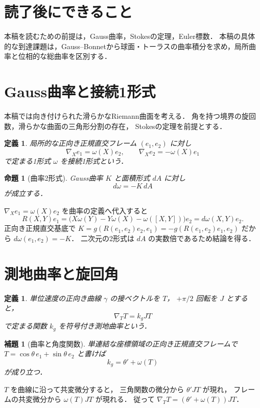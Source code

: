 \documentclass[a5paper,10pt,onecolumn]{jsarticle}
\makeatletter
\theoremstyle{mathnotetheorem}
\newtheorem{definition}[theorem]{定義}
\newtheorem{lemma}[theorem]{補題}
\newtheorem{proposition}[theorem]{命題}
\renewcommand{\proofname}{証明}
\renewenvironment{proof}[1][\proofname]{%
  \par\pushQED{\qed}\normalfont\topsep4\p@\@plus2\p@\relax
  \trivlist\item[\hskip\labelsep\bfseries #1]\ignorespaces
}{\popQED\endtrivlist\@endpefalse}
\makeatother
\begin{document}
\section*{読了後にできること}
本稿を読むための前提は，Gauss曲率，Stokesの定理，Euler標数．
本稿の具体的な到達課題は，Gauss--Bonnetから球面・トーラスの曲率積分を求め，局所曲率と位相的な総曲率を区別する．


\section{Gauss曲率と接続1形式}
本稿では向き付けられた滑らかなRiemann曲面を考える．
角を持つ境界の旋回数，滑らかな曲面の三角形分割の存在，
Stokesの定理を前提とする．
\begin{definition}
局所的な正向き正規直交フレーム $(e_1,e_2)$ に対し
\[
 \nabla_Xe_1=\omega(X)e_2,\qquad
 \nabla_Xe_2=-\omega(X)e_1
\]
で定まる1形式 $\omega$ を接続1形式という．
\end{definition}
\begin{proposition}[曲率2形式]\label{prop:curvform}
Gauss曲率 $K$ と面積形式 $dA$ に対し
\[
 d\omega=-K\,dA
\]
が成立する．
\end{proposition}
\begin{proof}
$\nabla_Xe_1=\omega(X)e_2$ を曲率の定義へ代入すると
\[
 R(X,Y)e_1=
 \bigl(X\omega(Y)-Y\omega(X)-\omega([X,Y])\bigr)e_2
 =d\omega(X,Y)e_2.
\]
正向き正規直交基底で
$K=g(R(e_1,e_2)e_2,e_1)
=-g(R(e_1,e_2)e_1,e_2)$ だから
$d\omega(e_1,e_2)=-K$．
二次元の2形式は $dA$ の実数倍であるため結論を得る．
\end{proof}
\section{測地曲率と旋回角}
\begin{definition}
単位速度の正向き曲線 $\gamma$ の接ベクトルを $T$，
$+\pi/2$ 回転を $J$ とすると，
\[
 \nabla_TT=k_gJT
\]
で定まる関数 $k_g$ を符号付き測地曲率という．
\end{definition}
\begin{lemma}[曲率と角度関数]\label{lem:turn}
単連結な座標領域の正向き正規直交フレームで
$T=\cos\theta\,e_1+\sin\theta\,e_2$ と書けば
\[
 k_g=\theta'+\omega(T)
\]
が成り立つ．
\end{lemma}
\begin{proof}
$T$ を曲線に沿って共変微分すると，
三角関数の微分から $\theta'JT$ が現れ，
フレームの共変微分から $\omega(T)JT$ が現れる．
従って $\nabla_TT=(\theta'+\omega(T))JT$．
\end{proof}
\end{document}
